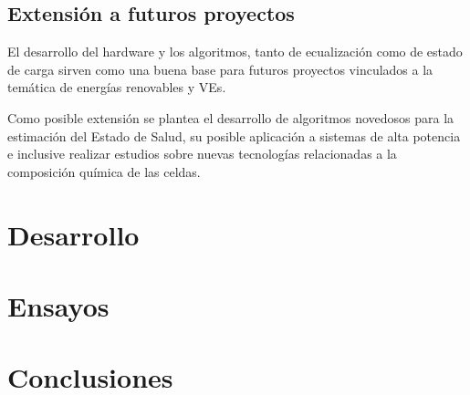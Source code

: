 \documentclass[10pt,a4paper]{article}
\begin{document}
	\subsection{Extensión a futuros proyectos}
	
	El desarrollo del hardware y los algoritmos, tanto de ecualización como de estado de carga sirven como una buena base para futuros proyectos vinculados a la temática de energías renovables y \acrshort{VE}s.
	
	Como posible extensión se plantea el desarrollo de algoritmos novedosos para la estimación del Estado de Salud, su posible aplicación a sistemas de alta potencia e inclusive realizar estudios sobre nuevas tecnologías relacionadas a la composición química de las celdas.
	
	\newpage

    \section{Desarrollo}\label{desarrollo}
    \newpage
    
    \section{Ensayos}\label{ensayos}
    \newpage

    \section{Conclusiones}\label{conclusiones}
    \printbibliography

    \newpage
    \glsaddall
    \printnoidxglossary[type=\acronymtype,title={Abreviaturas}]
\end{document}
